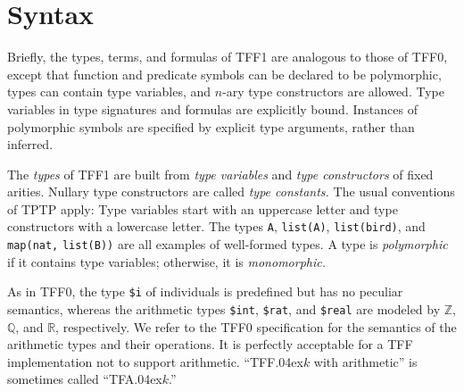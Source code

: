 \section{Syntax} \label{sec_syntax}

Briefly, the types, terms, and formulas of TFF1 are analogous to those of TFF0,
except that function and predicate symbols can be declared to be polymorphic,
types can contain type variables, and $n$-ary type constructors are allowed.
Type variables in type signatures and formulas are explicitly bound. Instances of
polymorphic symbols are specified by explicit type arguments, rather than
inferred.

 The {\em types\/} of TFF1 are built from {\em type
variables\/} and {\em type constructors\/} of fixed arities. Nullary type
constructors are called {\em type constants.} The usual conventions of TPTP
apply: Type variables start with an uppercase letter and type constructors
with a lowercase letter. The types \verb+A+, \verb+list(A)+, \verb+list(bird)+,
and \verb+map(nat,+ \verb+list(B))+ are all examples of well-formed types. A
type is {\em polymorphic} if it contains type variables; otherwise, it is {\em
monomorphic.}


\nopagebreak %

As in TFF0, the type {\tt \$i} %
of individuals is predefined but has no peculiar semantics, whereas the
arithmetic types
{\tt \$int}, {\tt \$rat}, and {\tt \$real} are modeled by $\mathbb{Z}$,
$\mathbb{Q}$, and $\mathbb{R}$, respectively. We refer
to the TFF0 specification \cite{sutcliffe-et-al-2012-tff0} for the semantics of
the arithmetic types and their operations. It is perfectly acceptable for a TFF
implementation not to support arithmetic. ``TFF\kern.04ex$k$ with arithmetic'' is
sometimes called ``TFA\kern.04ex$k$.''

